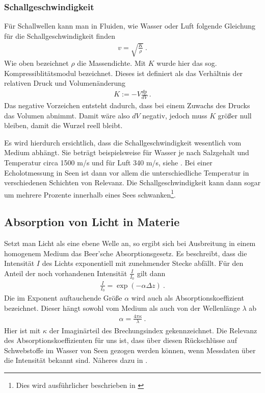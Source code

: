 \documentclass[12pt,a4paper,titlepage,headinclude,bibtotoc]{scrartcl}
\numberwithin{equation}{subsection}
\begin{document}
\subsubsection{Schallgeschwindigkeit}
\label{sec:theschallgeschw}
Für Schallwellen kann man in Fluiden, wie Wasser oder Luft folgende Gleichung für die Schallgeschwindigkeit finden
\begin{align}
 v = \sqrt{  \frac{K}{\rho}  }~.
\end{align}
Wie oben bezeichnet $\rho$ die Massendichte. Mit $K$ wurde hier das sog. Kompressiblitätsmodul bezeichnet. Dieses ist definiert als das Verhältnis der relativen Druck und Volumenänderung
\begin{align}
 K := - V \frac{d p}{d V} ~.
\end{align}
Das negative Vorzeichen entsteht dadurch, dass bei einem Zuwachs des Drucks das Volumen abnimmt. Damit wäre also $dV$ negativ, jedoch muss $K$ größer null bleiben, damit die Wurzel reell bleibt.


Es wird hierdurch ersichtlich, dass die Schallgeschwindigkeit wesentlich vom Medium abhängt. 
Sie beträgt beispielsweise für Wasser je nach Salzgehalt und Temperatur circa 1500 m/s  und für Luft 340 m/s, siehe \cite[S.467]{tipler}.
Bei einer Echolotmessung in Seen ist dann vor allem die unterschiedliche Temperatur in verschiedenen Schichten 
von Relevanz. Die Schallgeschwindigkeit kann dann sogar um mehrere Prozente innerhalb eines Sees schwanken\footnote{Dies wird ausführlicher beschrieben in \cite{schicht}}.



\subsection{Absorption von Licht in Materie}
Setzt man Licht als eine ebene Welle an, so ergibt sich bei Ausbreitung in einem homogenem Medium das Beer'sche Absorptionsgesetz.
Es beschreibt, dass die Intensität $I$ des Lichts exponentiell mit zunehmender Stecke abfällt.
Für den Anteil der noch vorhandenen Intensität $\frac{I}{I_0}$ gilt dann
\begin{align}
 \frac{I}{I_0}  =  \exp(- \alpha  \Delta z)~.\label{eq:absorblicht}
\end{align}
Die im Exponent auftauchende Größe $\alpha$ wird auch als Absorptionskoeffizient bezeichnet. Dieser hängt sowohl vom Medium als auch von der Wellenlänge $\lambda$ ab
\begin{align}
 \alpha= \frac{4 \pi \kappa}{\lambda}~.
\end{align}
Hier ist mit $\kappa$ der Imaginärteil des Brechungsindex gekennzeichnet.
Die Relevanz des Absorptionskoeffizienten für uns ist, dass über diesen Rückschlüsse auf Schwebstoffe im Wasser von Seen gezogen werden können, wenn Messdaten über die Intensität bekannt sind. Näheres dazu in 
\cite[S.229]{meschede}.
\end{document}
